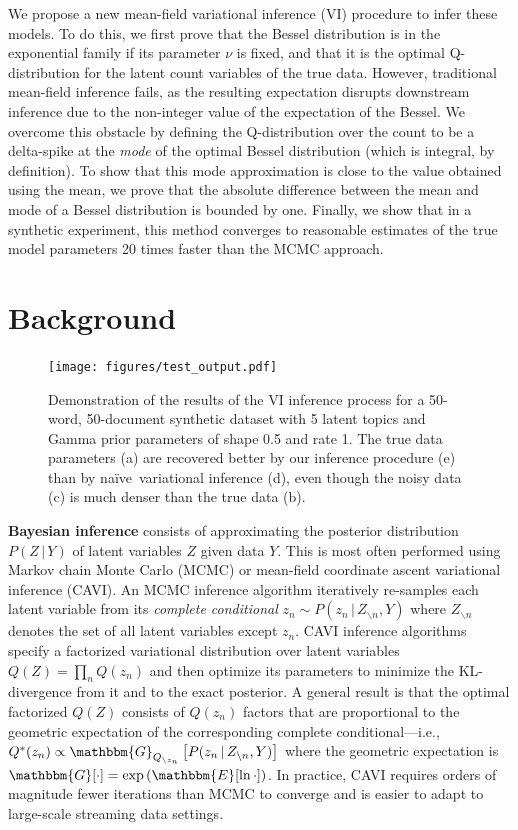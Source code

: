 \documentclass{article}
\newcommand{\Gqnot}[2]{\mathbbm{G}_{Q_{\backslash #1}}\left[#2\right]}
\newcommand{\naive}{na\"{i}ve}
\begin{document}
  We propose a new mean-field variational inference (VI) procedure to infer
  these models. To do this, we first prove that the Bessel distribution is in
  the exponential family if its parameter $\nu$ is fixed, and that it is the
  optimal Q-distribution for the latent count variables of the true data.
  However, traditional mean-field inference fails, as the resulting expectation
  disrupts downstream inference due to the non-integer value of the expectation
  of the Bessel. We overcome this obstacle by defining the Q-distribution over
  the count to be a delta-spike at the \emph{mode} of the optimal Bessel
  distribution (which is integral, by definition). To show that this mode
  approximation is close to the value obtained using the mean, we prove that the
  absolute difference between the mean and mode of a Bessel distribution is
  bounded by one. Finally, we show that in a synthetic experiment, this method
  converges to reasonable estimates of the true model parameters 20 times faster
  than the MCMC approach.
  
  \section{Background}

  \begin{figure}[t]
    \centering
    \texttt{[image: figures/test\_output.pdf]}
    \caption{Demonstration of the results of the VI inference process for a
     50-word, 50-document synthetic dataset with 5 latent topics and Gamma prior
     parameters of shape 0.5 and rate 1. The true data parameters (a) are
     recovered better by our inference procedure (e) than by \naive~variational
     inference (d), even though the noisy data (c) is much denser than the true
     data (b).}
    \label{fig:test_output}
  \end{figure}

  \textbf{Bayesian inference} consists of approximating the posterior
  distribution $P(Z\,|\,Y)$ of latent variables $Z$ given data $Y$. This is
  most often performed using Markov chain Monte Carlo (MCMC) or mean-field
  coordinate ascent variational inference (CAVI). An MCMC inference algorithm
  iteratively re-samples each latent variable from its \emph{complete
  conditional} $z_n \sim P(z_n\,|\,Z_{\backslash n}, Y)$ where $Z_{\backslash
  n}$ denotes the set of all latent variables except $z_n$. CAVI inference
  algorithms specify a factorized variational distribution over latent
  variables $Q(Z) = \prod_n Q(z_n)$ and then optimize its parameters to
  minimize the KL-divergence from it and to the exact posterior. A general
  result is that the optimal factorized $Q(Z)$ consists of $Q(z_n)$ factors
  that are proportional to the geometric expectation of the corresponding
  complete conditional---i.e., $Q^*(z_n) \propto
  \Gqnot{z_n}{P(z_n\,|\,Z_{\backslash n}, Y)}$ where the geometric expectation
  is $\mathbbm{G}[\cdot]=\exp\left(\mathbbm{E}[\ln \cdot]\right)$. In
  practice, CAVI requires orders of magnitude fewer iterations than MCMC to
  converge and is easier to adapt to large-scale streaming data settings.
  
\end{document}
